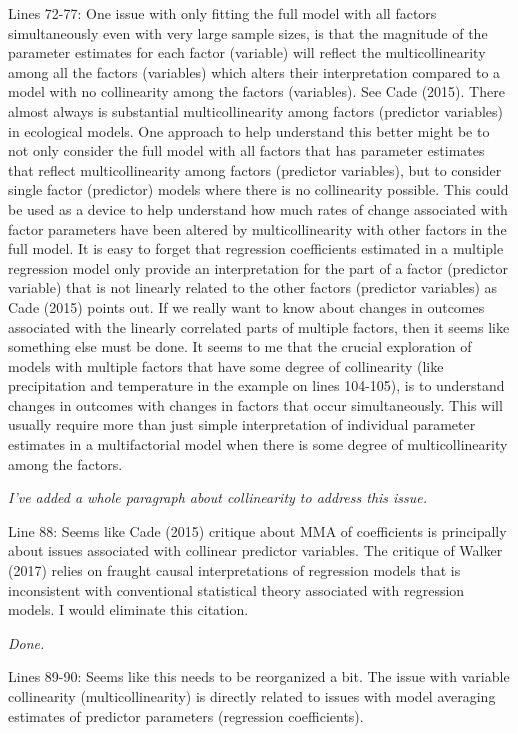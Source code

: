 \documentclass[12pt]{article}
\begin{document}
Lines 72-77: One issue with only ﬁtting the full model with all factors
simultaneously even with very large sample sizes, is that the magnitude
of the parameter estimates for each factor (variable) will reﬂect the
multicollinearity among all the factors (variables) which alters their
interpretation compared to a model with no collinearity among the
factors (variables). See Cade (2015). There almost always is substantial
multicollinearity among factors (predictor variables) in ecological
models. One approach to help understand this better might be to not only
consider the full model with all factors that has parameter estimates
that reﬂect multicollinearity among factors (predictor variables), but
to consider single factor (predictor) models where there is no
collinearity possible. This could be used as a device to help understand
how much rates of change associated with factor parameters have been
altered by multicollinearity with other factors in the full model. It is
easy to forget that regression coeﬃcients estimated in a multiple
regression model only provide an interpretation for the part of a factor
(predictor variable) that is not linearly related to the other factors
(predictor variables) as Cade (2015) points out. If we really want to
know about changes in outcomes associated with the linearly correlated
parts of multiple factors, then it seems like something else must be
done. It seems to me that the crucial exploration of models with
multiple factors that have some degree of collinearity (like
precipitation and temperature in the example on lines 104-105), is to
understand changes in outcomes with changes in factors that occur
simultaneously. This will usually require more than just simple
interpretation of individual parameter estimates in a multifactorial
model when there is some degree of multicollinearity among the factors.

\emph{I've added a whole paragraph about collinearity to address this
issue.}

Line 88: Seems like Cade (2015) critique about MMA of coeﬃcients is
principally about issues associated with collinear predictor variables.
The critique of Walker (2017) relies on fraught causal interpretations
of regression models that is inconsistent with conventional statistical
theory associated with regression models. I would eliminate this
citation.

\emph{Done.}

Lines 89-90: Seems like this needs to be reorganized a bit. The issue
with variable collinearity (multicollinearity) is directly related to
issues with model averaging estimates of predictor parameters
(regression coeﬃcients).
\end{document}
